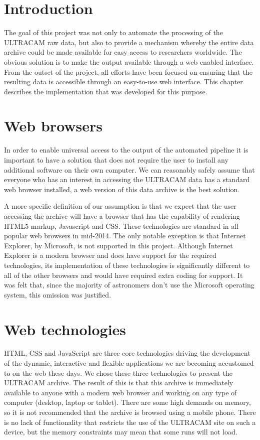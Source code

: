 \section{Introduction} 
The goal of this project was not only to automate the processing of the ULTRACAM raw data, but also to provide a mechanism whereby the entire data archive could be made available for easy access to researchers worldwide. The obvious solution is to make the output available through a web enabled interface. From the outset of the project, all efforts have been focused on ensuring that the resulting data is accessible through an easy-to-use web interface. This chapter describes the implementation that was developed for this purpose. 

\section{Web browsers}
In order to enable universal access to the output of the automated pipeline it is important to have a solution that does not require the user to install any additional software on their own computer. We can reasonably safely assume that everyone who has an interest in accessing the ULTRACAM data has a standard web browser installed, a web version of this data archive is the best solution. 

A more specific definition of our assumption is that we expect that the user accessing the archive will have a browser that has the capability of rendering HTML5 markup, Javascript and CSS. These technologies are standard in all popular web browsers in mid-2014. The only notable exception is that Internet Explorer, by Microsoft, is not supported in this project. Although Internet Explorer is a modern browser and does have support for the required technologies, its implementation of these technologies is significantly different to all of the other browsers and would have required extra coding for support. It was felt that, since the majority of astronomers don't use the Microsoft operating system, this omission was justified.  

\section{Web technologies}
HTML, CSS and JavaScript are three core technologies driving the development of the dynamic, interactive and flexible applications we are becoming accustomed to on the web these days. We chose these three technologies to present the ULTRACAM archive. The result of this is that this archive is immediately available to anyone with a modern web browser and working on any type of computer (desktop, laptop or tablet). There are some high demands on memory, so it is not recommended that the archive is browsed using a mobile phone. There is no lack of functionality that restricts the use of the ULTRACAM site on such a device, but the memory constraints may mean that some runs will not load.  

